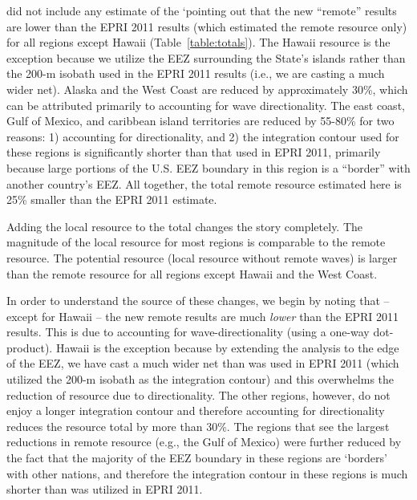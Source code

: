 did not include any estimate of the `pointing out that the new ``remote'' results are lower than the EPRI 2011 results (which estimated the remote resource only) for all regions except Hawaii (Table~\ref{table:totals}). The Hawaii resource is the exception because we utilize the EEZ surrounding the State's islands rather than the 200-m isobath used in the EPRI 2011 results (i.e., we are casting a much wider net). Alaska and the West Coast are reduced by approximately 30\%, which can be attributed primarily to accounting for wave directionality. The east coast, Gulf of Mexico, and caribbean island territories are reduced by 55-80\% for two reasons: 1) accounting for directionality, and 2) the integration contour used for these regions is significantly shorter than that used in EPRI 2011, primarily because large portions of the U.S. EEZ boundary in this region is a ``border'' with another country's EEZ. All together, the total remote resource estimated here is 25\% smaller than the EPRI 2011 estimate.

Adding the local resource to the total changes the story completely. The magnitude of the local resource for most regions is comparable to the remote resource. The potential resource (local resource without remote waves) is larger than the remote resource for all regions except Hawaii and the West Coast.


In order to understand the source of these changes, we begin by noting that -- except for Hawaii -- the new remote results are much {\em lower} than the EPRI 2011 results. This is due to accounting for wave-directionality (using a one-way dot-product). Hawaii is the exception because by extending the analysis to the edge of the EEZ, we have cast a much wider net than was used in EPRI 2011 (which utilized the 200-m isobath as the integration contour) and this overwhelms the reduction of resource due to directionality. The other regions, however, do not enjoy a longer integration contour and therefore accounting for directionality reduces the resource total by more than 30\%. The regions that see the largest reductions in remote resource (e.g., the Gulf of Mexico) were further reduced by the fact that the majority of the EEZ boundary in these regions are `borders' with other nations, and therefore the integration contour in these regions is much shorter than was utilized in EPRI 2011.

